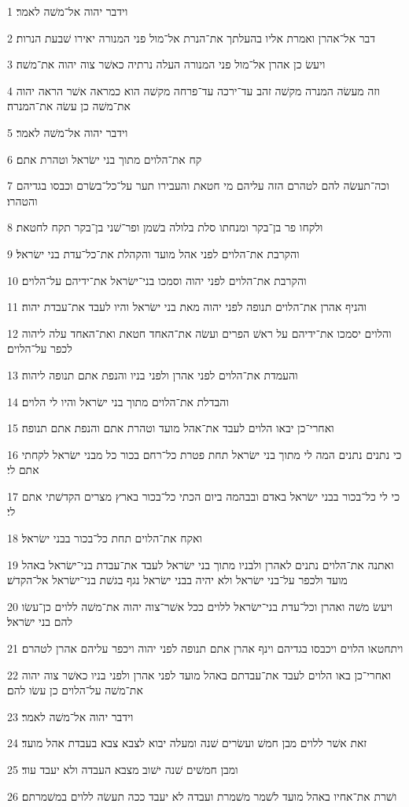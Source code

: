 \par 1 וידבר יהוה אל־משׁה לאמר׃
\par 2 דבר אל־אהרן ואמרת אליו בהעלתך את־הנרת אל־מול פני המנורה יאירו שׁבעת הנרות׃
\par 3 ויעשׂ כן אהרן אל־מול פני המנורה העלה נרתיה כאשׁר צוה יהוה את־משׁה׃
\par 4 וזה מעשׂה המנרה מקשׁה זהב עד־ירכה עד־פרחה מקשׁה הוא כמראה אשׁר הראה יהוה את־משׁה כן עשׂה את־המנרה׃
\par 5 וידבר יהוה אל־משׁה לאמר׃
\par 6 קח את־הלוים מתוך בני ישׂראל וטהרת אתם׃
\par 7 וכה־תעשׂה להם לטהרם הזה עליהם מי חטאת והעבירו תער על־כל־בשׂרם וכבסו בגדיהם והטהרו׃
\par 8 ולקחו פר בן־בקר ומנחתו סלת בלולה בשׁמן ופר־שׁני בן־בקר תקח לחטאת׃
\par 9 והקרבת את־הלוים לפני אהל מועד והקהלת את־כל־עדת בני ישׂראל׃
\par 10 והקרבת את־הלוים לפני יהוה וסמכו בני־ישׂראל את־ידיהם על־הלוים׃
\par 11 והניף אהרן את־הלוים תנופה לפני יהוה מאת בני ישׂראל והיו לעבד את־עבדת יהוה׃
\par 12 והלוים יסמכו את־ידיהם על ראשׁ הפרים ועשׂה את־האחד חטאת ואת־האחד עלה ליהוה לכפר על־הלוים׃
\par 13 והעמדת את־הלוים לפני אהרן ולפני בניו והנפת אתם תנופה ליהוה׃
\par 14 והבדלת את־הלוים מתוך בני ישׂראל והיו לי הלוים׃
\par 15 ואחרי־כן יבאו הלוים לעבד את־אהל מועד וטהרת אתם והנפת אתם תנופה׃
\par 16 כי נתנים נתנים המה לי מתוך בני ישׂראל תחת פטרת כל־רחם בכור כל מבני ישׂראל לקחתי אתם לי׃
\par 17 כי לי כל־בכור בבני ישׂראל באדם ובבהמה ביום הכתי כל־בכור בארץ מצרים הקדשׁתי אתם לי׃
\par 18 ואקח את־הלוים תחת כל־בכור בבני ישׂראל׃
\par 19 ואתנה את־הלוים נתנים לאהרן ולבניו מתוך בני ישׂראל לעבד את־עבדת בני־ישׂראל באהל מועד ולכפר על־בני ישׂראל ולא יהיה בבני ישׂראל נגף בגשׁת בני־ישׂראל אל־הקדשׁ׃
\par 20 ויעשׂ משׁה ואהרן וכל־עדת בני־ישׂראל ללוים ככל אשׁר־צוה יהוה את־משׁה ללוים כן־עשׂו להם בני ישׂראל׃
\par 21 ויתחטאו הלוים ויכבסו בגדיהם וינף אהרן אתם תנופה לפני יהוה ויכפר עליהם אהרן לטהרם׃
\par 22 ואחרי־כן באו הלוים לעבד את־עבדתם באהל מועד לפני אהרן ולפני בניו כאשׁר צוה יהוה את־משׁה על־הלוים כן עשׂו להם׃
\par 23 וידבר יהוה אל־משׁה לאמר׃
\par 24 זאת אשׁר ללוים מבן חמשׁ ועשׂרים שׁנה ומעלה יבוא לצבא צבא בעבדת אהל מועד׃
\par 25 ומבן חמשׁים שׁנה ישׁוב מצבא העבדה ולא יעבד עוד׃
\par 26 ושׁרת את־אחיו באהל מועד לשׁמר משׁמרת ועבדה לא יעבד ככה תעשׂה ללוים במשׁמרתם׃

